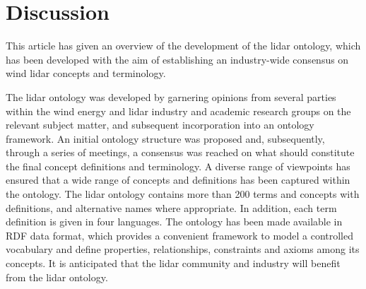 \documentclass[remotesensing,article,submit,pdftex,moreauthors]{Definitions/mdpi}
\begin{document}




\section{Discussion}
\label{sec:Discussion}
This article has given an overview of the development of the lidar ontology, which has been developed with the aim of establishing an industry-wide consensus on wind lidar concepts and terminology.

The lidar ontology was developed by garnering opinions from several parties within the wind energy and lidar industry and academic research groups on the relevant subject matter, and subsequent incorporation into an ontology framework. 
An initial ontology structure was proposed and, subsequently, through a series of meetings, a consensus was reached on what should constitute the final concept definitions and terminology.
A diverse range of viewpoints has ensured that a wide range of concepts and definitions has been captured within the ontology. 
The lidar ontology contains more than 200 terms and concepts with definitions, and alternative names where appropriate. In addition, each term definition is given in four languages. 
The ontology has been made available in RDF data format, which provides a convenient framework to model a controlled vocabulary and define properties, relationships, constraints and axioms among its concepts.
It is anticipated that the lidar community and industry will benefit from the lidar ontology.


\end{document}
